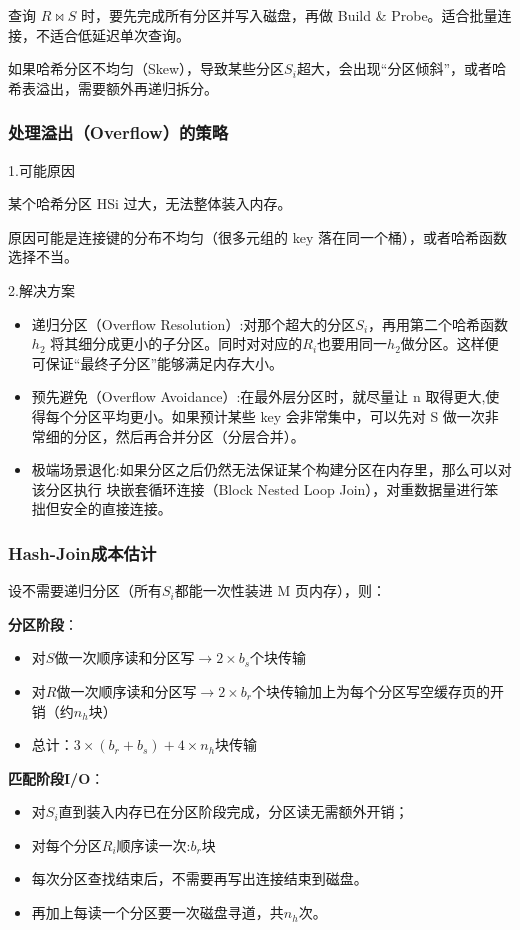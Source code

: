 查询 $R\Join S$ 时，要先完成所有分区并写入磁盘，再做 Build \& Probe。适合批量连接，不适合低延迟单次查询。

如果哈希分区不均匀（Skew），导致某些分区$S_i$超大，会出现“分区倾斜”，或者哈希表溢出，需要额外再递归拆分。

\subsubsection{处理溢出（Overflow）的策略}

\noindent 1.可能原因

某个哈希分区 HSi 过大，无法整体装入内存。

原因可能是连接键的分布不均匀（很多元组的 key 落在同一个桶），或者哈希函数选择不当。

\noindent 2.解决方案

\begin{itemize}
    \item 递归分区（Overflow Resolution）:对那个超大的分区$S_i$，再用第二个哈希函数$h_2$ 将其细分成更小的子分区。同时对对应的$R_i$也要用同一$h_2$做分区。这样便可保证“最终子分区”能够满足内存大小。
    \item 预先避免（Overflow Avoidance）:在最外层分区时，就尽量让 n 取得更大,使得每个分区平均更小。如果预计某些 key 会非常集中，可以先对 S 做一次非常细的分区，然后再合并分区（分层合并）。
    \item 极端场景退化:如果分区之后仍然无法保证某个构建分区在内存里，那么可以对该分区执行 块嵌套循环连接（Block Nested Loop Join），对重数据量进行笨拙但安全的直接连接。
\end{itemize}

\subsubsection{Hash-Join成本估计}

设不需要递归分区（所有$S_i$都能一次性装进 M 页内存），则：

\noindent\textbf{分区阶段}：
 \begin{itemize}
    \item 对$S$做一次顺序读和分区写$\to 2\times b_s$个块传输
    \item 对$R$做一次顺序读和分区写$\to 2\times b_r$个块传输加上为每个分区写空缓存页的开销（约$n_h$块）
    \item 总计：$3\times (b_r+b_s)+4\times n_h$块传输
 \end{itemize}

 \noindent\textbf{匹配阶段I/O}：
 \begin{itemize}
    \item 对$S_i$直到装入内存已在分区阶段完成，分区读无需额外开销；
    \item 对每个分区$R_i$顺序读一次:$b_r$块
    \item 每次分区查找结束后，不需要再写出连接结束到磁盘。
    \item 再加上每读一个分区要一次磁盘寻道，共$n_h$次。
 \end{itemize}


